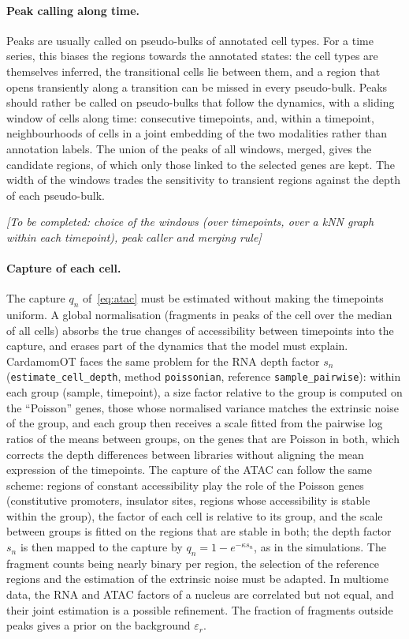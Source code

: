 \documentclass[a4paper, 11pt]{article}
\newcommand{\tofill}[1]{\par\smallskip\noindent\emph{[To be completed: #1]}\par\smallskip}
\theoremstyle{plain}
\theoremstyle{remark}
\begin{document}
\paragraph{Peak calling along time.} Peaks are usually called on pseudo-bulks of annotated cell types. For a time series, this biases the regions towards the annotated states: the cell types are themselves inferred, the transitional cells lie between them, and a region that opens transiently along a transition can be missed in every pseudo-bulk. Peaks should rather be called on pseudo-bulks that follow the dynamics, with a sliding window of cells along time: consecutive timepoints, and, within a timepoint, neighbourhoods of cells in a joint embedding of the two modalities rather than annotation labels. The union of the peaks of all windows, merged, gives the candidate regions, of which only those linked to the selected genes are kept. The width of the windows trades the sensitivity to transient regions against the depth of each pseudo-bulk.
\tofill{choice of the windows (over timepoints, over a kNN graph within each timepoint), peak caller and merging rule}

\paragraph{Capture of each cell.} The capture $q_n$ of~\eqref{eq:atac} must be estimated without making the timepoints uniform. A global normalisation (fragments in peaks of the cell over the median of all cells) absorbs the true changes of accessibility between timepoints into the capture, and erases part of the dynamics that the model must explain. CardamomOT faces the same problem for the RNA depth factor $s_n$ (\texttt{estimate\_cell\_depth}, method \texttt{poissonian}, reference \texttt{sample\_pairwise}): within each group (sample, timepoint), a size factor relative to the group is computed on the ``Poisson'' genes, those whose normalised variance matches the extrinsic noise of the group, and each group then receives a scale fitted from the pairwise log ratios of the means between groups, on the genes that are Poisson in both, which corrects the depth differences between libraries without aligning the mean expression of the timepoints. The capture of the ATAC can follow the same scheme: regions of constant accessibility play the role of the Poisson genes (constitutive promoters, insulator sites, regions whose accessibility is stable within the group), the factor of each cell is relative to its group, and the scale between groups is fitted on the regions that are stable in both; the depth factor $s_n$ is then mapped to the capture by $q_n = 1 - e^{-\kappa s_n}$, as in the simulations. The fragment counts being nearly binary per region, the selection of the reference regions and the estimation of the extrinsic noise must be adapted. In multiome data, the RNA and ATAC factors of a nucleus are correlated but not equal, and their joint estimation is a possible refinement. The fraction of fragments outside peaks gives a prior on the background $\varepsilon_r$.
\end{document}
